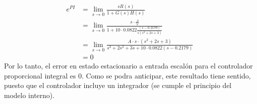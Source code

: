 \documentclass[
  11pt,
  letterpaper,
   addpoints,
   answers
  ]{exam}
\begin{document}
\begin{questions}
\begin{solution}
\begin{enumerate}
\begin{enumerate}
    \begin{align}
        e^{PI}&=\lim_{s\to 0}\frac{sR(s)}{1+ G(s)H(s)} \nonumber \\
        &=\lim_{s \to 0} \frac{s \cdot \frac{A}{s}}{1+10\cdot0.0822\frac{(s-0.2179)}{s(s^2+2s+3)}} \nonumber \\
        &=\lim_{s \to 0}\frac{A\cdot s \cdot (s^2+2s+3)}{s^3+2s^2+3s + 10\cdot0.0822(s-0.2179)} \nonumber \\
        &=0
    \end{align}
    Por lo tanto, el error en estado estacionario a entrada escalón para el controlador proporcional integral es 0. Como se podra anticipar, este resultado tiene sentido, puesto que el controlador incluye un integrador (se cumple el principio del modelo interno).
\end{enumerate}
\end{enumerate}
\end{solution}
\end{questions}
\newpage
\end{document}
